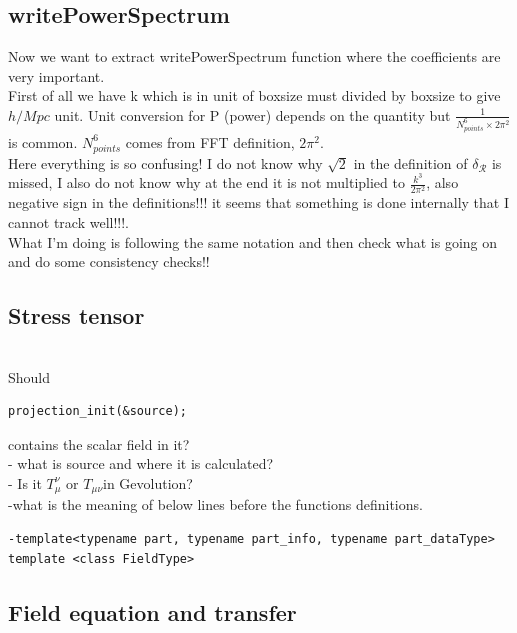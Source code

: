 \documentclass[a4paper,14pt]{article}
\begin{document}
\subsection{writePowerSpectrum}
Now we want to extract writePowerSpectrum function where the coefficients are very important. \\
First of all  we have k which is in unit of boxsize must divided by boxsize to give $h/Mpc$ unit. Unit conversion for P (power) depends on the quantity but $\frac{1}{N_{points}^6 \times 2 \pi^2}$ is common. $N_{points}^6$ comes from FFT definition, $2 \pi^2$. \\
{\color{red} Here everything is so confusing! I do not know why $\sqrt{2}$ in the definition of $\delta_{\mathcal{R}}$ is missed, I also do not know why at the end it is not multiplied to $\frac{k^3}{2 \pi ^2}$, also negative sign in the definitions!!! it seems that  something is done internally that I cannot track well!!!}. \\
What I'm doing is following the same notation and then check what is going on and do some consistency checks!!


 \subsection{Stress tensor}
{ \color{red}{ Todo: How to add stress tensor?}} \\
Should  
{\begin{lstlisting}
projection_init(&source); 
\end{lstlisting}}
contains the scalar field in it?\\
- what is source and where it is calculated? \\
- Is it $T_\mu^{\nu}$ or $T_{\mu \nu} $in Gevolution?\\
-what is the meaning of below lines before the functions definitions.
{\begin{lstlisting}
-template<typename part, typename part_info, typename part_dataType>
template <class FieldType>
\end{lstlisting}}
 \subsection{Field equation and transfer}
 { \color{red}{ Todo: use the correct field equation and check the transfer function in time?}}
\end{document}
